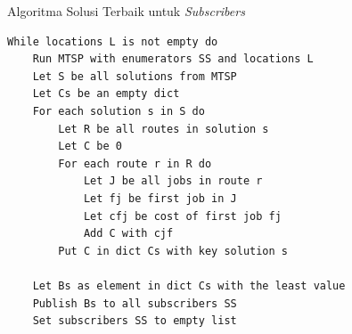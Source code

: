 \begin{listing}
	\caption{Algoritma Solusi Terbaik untuk \textit{Subscribers}}
	\label{lst:proposed_subscribers_best_solution_algorithm}
	\begin{verbatim}
While locations L is not empty do
	Run MTSP with enumerators SS and locations L
    Let S be all solutions from MTSP
    Let Cs be an empty dict
    For each solution s in S do
	    Let R be all routes in solution s
	    Let C be 0
	    For each route r in R do
		    Let J be all jobs in route r
		    Let fj be first job in J
		    Let cfj be cost of first job fj
		    Add C with cjf
	    Put C in dict Cs with key solution s
	
    Let Bs as element in dict Cs with the least value
    Publish Bs to all subscribers SS
    Set subscribers SS to empty list
	\end{verbatim}
\end{listing}








